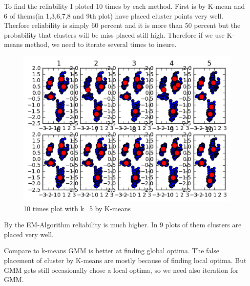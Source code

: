 \documentclass[a4paper,11pt]{article}
\begin{document}
To find the reliability I ploted 10 times by each method.
First is by K-mean and 6 of thems(in 1,3,6,7,8 and 9th plot) have placed cluster points very well. Therfore reliability is simply 60 percent and it is more than 50 percent but the probability that clusters will be miss placed still high. Therefore if we use K-means method, we need to iterate several times to insure.

\begin{figure}[htbp]
  \includegraphics[scale=0.5]{kmean.png}
  \caption{10 times plot with k=5 by K-means}
\end{figure}

By the EM-Algorithm reliability is much higher. In 9 plots of them clusters are placed very well.

Compare to k-means GMM is better at finding global optima. The false placement of cluster by K-means are mostly because of finding local optima. But GMM gets still occasionally chose a local optima, so we need also iteration for GMM.
\end{document}
